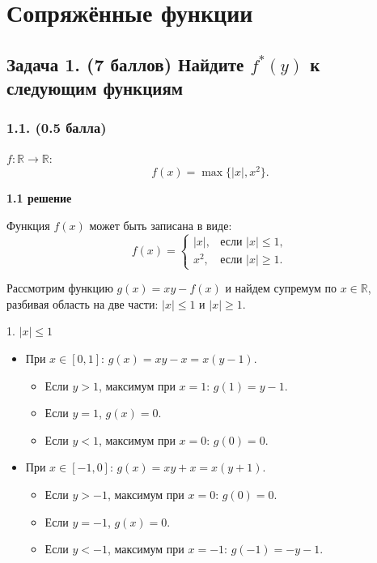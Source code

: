 \documentclass[12pt]{article}
\begin{document}
\section*{Сопряжённые функции}

\subsection*{Задача 1. (7 баллов) Найдите $ f^*(y) $ к следующим функциям}

\subsubsection*{1.1. (0.5 балла)}
$ f : \mathbb{R} \to \mathbb{R} $: 
$$
f(x) = \max \{ |x|, x^2 \}.
$$

\textbf{1.1 решение}

Функция $f(x)$ может быть записана в виде:
$$
f(x) = 
\begin{cases} 
|x|, & \text{если } |x| \leq 1, \\
x^2, & \text{если } |x| \geq 1.
\end{cases}
$$

Рассмотрим функцию  $g(x) = x y - f(x)$ и найдем супремум по $ x \in \mathbb{R} $, разбивая область на две части: $ |x| \leq 1 $ и $|x| \geq 1 $.

\vspace{5 mm}

1. $|x| \leq 1$

\begin{itemize}
\item При  $x \in [0, 1]$:  $g(x) = x y - x = x(y - 1) $.
  \begin{itemize}
  \item Если $ y > 1 $, максимум при $ x = 1 $: $ g(1) = y - 1 $.
  \item Если $ y = 1 $, $ g(x) = 0 $.
  \item Если $ y < 1 $, максимум при $ x = 0 $: $ g(0) = 0 $.
  \end{itemize}
  
\item При $ x \in [-1, 0] $: $ g(x) = x y + x = x(y + 1) $.
  \begin{itemize}
  \item Если $ y > -1 $, максимум при $ x = 0 $: $ g(0) = 0 $.
  \item Если $ y = -1 $, $ g(x) = 0 $.
  \item Если $ y < -1 $, максимум при $ x = -1 $: $ g(-1) = -y - 1 $.
  \end{itemize}
\end{itemize}
\end{document}
